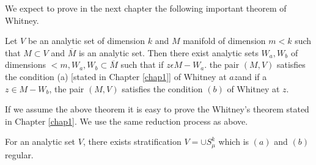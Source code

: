 We expect to prove in the next chapter the following important theorem
of Whitney. 

\begin{theorem*} %
  Let $V$ be an analytic set of dimension $k$ and $M$ manifold of
  dimension $m<k$ such that $M \subset V$ and $\overline{M}$ is an
  analytic set. Then there exist analytic sets $W_a, W_b$ of
  dimensions $< m,W_a, W_b \subset \overline{M}$ such that if $z
  \epsilon M-W_a$. the pair $(M,V)$ satisfies the condition (a)
  [stated in Chapter \ref{chap1}] of Whitney at 
  $az$\pageoriginale and if a $z \in M- W_{b}$, the pair $(M,V)$ satisfies the
  condition $(b)$ of Whitney at $z$. 
\end{theorem*}

If we assume the above theorem it is easy to prove the Whitney's
theorem stated in Chapter \ref{chap1}. We use the same reduction process as
above. 

\begin{theorem*} %
  For an analytic set $V$, there exists stratification $V = \cup
  S^{k}_{\mu}$ which is $(a)$ and $(b)$ regular. 
\end{theorem*} 

